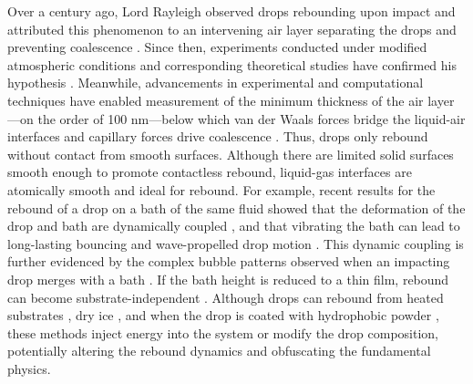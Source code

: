 \documentclass{jfm}
\begin{document}
Over a century ago, Lord Rayleigh observed drops rebounding upon impact \citep{rayleigh1879capillary} and attributed this phenomenon to an intervening air layer separating the drops and preventing coalescence \citep{rayleigh1899xxxvi}. Since then, experiments conducted under modified atmospheric conditions and corresponding theoretical studies have confirmed his hypothesis \citep{willis2000experiments,bach2004coalescence,chubynsky2020bouncing}. Meanwhile, advancements in experimental and computational techniques have enabled measurement of the minimum thickness of the air layer---on the order of 100 nm---below which van der Waals forces bridge the liquid-air interfaces and capillary forces drive coalescence \citep{couder2005bouncing,de2012dynamics,kolinski2012skating,kavehpour2015coalescence,sprittles2024gas,lewin2024collision}. Thus, drops only rebound without contact from smooth surfaces. Although there are limited solid surfaces smooth enough to promote contactless rebound, liquid-gas interfaces are atomically smooth and ideal for rebound. For example, recent results for the rebound of a drop on a bath of the same fluid showed that the deformation of the drop and bath are dynamically coupled \citep{alventosa2023inertio,Phillips_Milewski_2024}, and that vibrating the bath can lead to long-lasting bouncing and wave-propelled drop motion \citep{couder2005walking,molavcek2013drops}. This dynamic coupling is further evidenced by the complex bubble patterns observed when an impacting drop merges with a bath \citep{saylor2012experimental}. If the bath height is reduced to a thin film, rebound can become substrate-independent \citep{hao2015superhydrophobic,sanjay2023drop}. Although drops can rebound from heated substrates \citep{biance2006elasticity}, dry ice \citep{li2024rebound}, and when the drop is coated with hydrophobic powder \citep{aussillous2006properties}, these methods inject energy into the system or modify the drop composition, potentially altering the rebound dynamics and obfuscating the fundamental physics.
\end{document}
